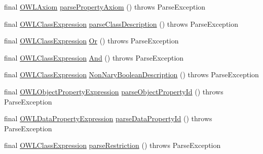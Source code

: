 \begin{DoxyCompactItemize}
\item 
final \hyperlink{interfaceorg_1_1semanticweb_1_1owlapi_1_1model_1_1_o_w_l_axiom}{O\-W\-L\-Axiom} \hyperlink{classuk_1_1ac_1_1manchester_1_1cs_1_1owlapi_1_1dlsyntax_1_1parser_1_1_d_l_syntax_parser_ad6dea7fafffa640924268ec8b68fcf22}{parse\-Property\-Axiom} ()  throws Parse\-Exception 
\item 
final \hyperlink{interfaceorg_1_1semanticweb_1_1owlapi_1_1model_1_1_o_w_l_class_expression}{O\-W\-L\-Class\-Expression} \hyperlink{classuk_1_1ac_1_1manchester_1_1cs_1_1owlapi_1_1dlsyntax_1_1parser_1_1_d_l_syntax_parser_a365867ab5737cafdc7ab03ba9ad8daa0}{parse\-Class\-Description} ()  throws Parse\-Exception 
\item 
final \hyperlink{interfaceorg_1_1semanticweb_1_1owlapi_1_1model_1_1_o_w_l_class_expression}{O\-W\-L\-Class\-Expression} \hyperlink{classuk_1_1ac_1_1manchester_1_1cs_1_1owlapi_1_1dlsyntax_1_1parser_1_1_d_l_syntax_parser_a88cb969849106b69b397adcb7098060b}{Or} ()  throws Parse\-Exception 
\item 
final \hyperlink{interfaceorg_1_1semanticweb_1_1owlapi_1_1model_1_1_o_w_l_class_expression}{O\-W\-L\-Class\-Expression} \hyperlink{classuk_1_1ac_1_1manchester_1_1cs_1_1owlapi_1_1dlsyntax_1_1parser_1_1_d_l_syntax_parser_aac92718083bb0e556677f86058530f68}{And} ()  throws Parse\-Exception 
\item 
final \hyperlink{interfaceorg_1_1semanticweb_1_1owlapi_1_1model_1_1_o_w_l_class_expression}{O\-W\-L\-Class\-Expression} \hyperlink{classuk_1_1ac_1_1manchester_1_1cs_1_1owlapi_1_1dlsyntax_1_1parser_1_1_d_l_syntax_parser_a1c47ae59534def92cf4c24644e42b96c}{Non\-Nary\-Boolean\-Description} ()  throws Parse\-Exception 
\item 
final \hyperlink{interfaceorg_1_1semanticweb_1_1owlapi_1_1model_1_1_o_w_l_object_property_expression}{O\-W\-L\-Object\-Property\-Expression} \hyperlink{classuk_1_1ac_1_1manchester_1_1cs_1_1owlapi_1_1dlsyntax_1_1parser_1_1_d_l_syntax_parser_abeb4cf53a60009d965bb49ad09bd61f2}{parse\-Object\-Property\-Id} ()  throws Parse\-Exception 
\item 
final \hyperlink{interfaceorg_1_1semanticweb_1_1owlapi_1_1model_1_1_o_w_l_data_property_expression}{O\-W\-L\-Data\-Property\-Expression} \hyperlink{classuk_1_1ac_1_1manchester_1_1cs_1_1owlapi_1_1dlsyntax_1_1parser_1_1_d_l_syntax_parser_a6dec74891003d447bcc48f175dced11a}{parse\-Data\-Property\-Id} ()  throws Parse\-Exception 
\item 
final \hyperlink{interfaceorg_1_1semanticweb_1_1owlapi_1_1model_1_1_o_w_l_class_expression}{O\-W\-L\-Class\-Expression} \hyperlink{classuk_1_1ac_1_1manchester_1_1cs_1_1owlapi_1_1dlsyntax_1_1parser_1_1_d_l_syntax_parser_a912d03f23b33735bbfb5d3a50c03bf7f}{parse\-Restriction} ()  throws Parse\-Exception 

\end{DoxyCompactItemize}
